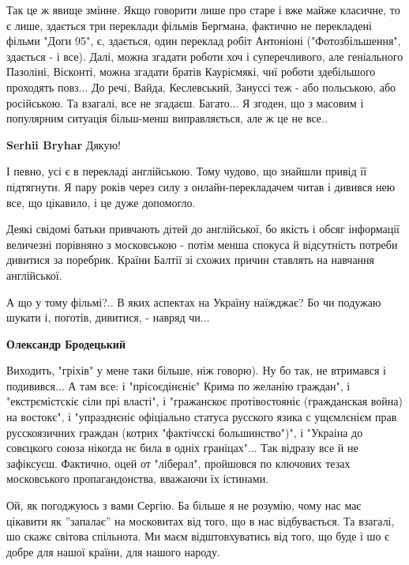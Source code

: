 \begin{itemize}
\begin{itemize}
Так це ж явище змінне. Якщо говорити лише про старе і вже майже класичне, то є
лише, здається три переклади фільмів Бергмана, фактично не перекладені фільми
"Доги 95", є, здається, один переклад робіт Антоніоні ("Фотозбільшення",
здається - і все). Далі, можна згадати роботи хоч і суперечливого, але
геніального Пазоліні, Вісконті, можна згадати братів Каурісмякі, чиї роботи
здебільшого проходять повз... До речі, Вайда, Кеслевський, Зануссі теж - або
польською, або російською. Та взагалі, все не згадаєш. Багато... Я згоден, що з
масовим і популярним ситуація більш-менш виправляється, але ж це не все..

\textbf{Serhii Bryhar} Дякую!

І певно, усі є в перекладі англійською. Тому чудово, що знайшли привід її
підтягнути. Я пару років через силу з онлайн-перекладачем читав і дивився нею
все, що цікавило, і це дуже допомогло.

Деякі свідомі батьки привчають дітей до англійської, бо якість і обсяг
інформації величезні порівняно з московською - потім менша спокуса й
відсутність потреби дивитися за поребрик. Країни Балтії зі схожих причин
ставлять на навчання англійської.

\end{itemize} %


А що у тому фільмі?.. В яких аспектах на Україну наїжджає? Бо чи подужаю шукати
і, поготів, дивитися, - навряд чи...

\begin{itemize} %
\textbf{Олександр Бродецький} 

Виходить, "гріхів" у мене таки більше, ніж говорю). Ну бо так, не втримався і
подивився... А там все: і "прісоєдінєніє" Крима по желанію граждан", і
"екстрємістскіє сіли прі власті", і "гражанскоє протівостояніє (гражданская
война) на востокє", і "упразднєніє офіціально статуса русского язика с
ущємлєнієм прав русскоязичних граждан (котрих "фактічєскі большинство")", і
"Украіна до совєцкого союза нікогда нє била в одніх граніцах"... Так відразу
все й не зафіксуєш. Фактично, оцей от "ліберал", пройшовся по ключових тезах
московського пропагандонства, вважаючи їх істинами.

\end{itemize} %


Ой, як погоджуюсь з вами Сергію. Ба більше я не розумію, чому нас має цікавити
як ''запалає'' на московитах від того, що в нас відбувається. Та взагалі, шо
скажє світова спільнота. Ми маєм відштовхуватись від того, що буде і шо є добре
для нашої країни, для нашого народу.


\end{itemize}
